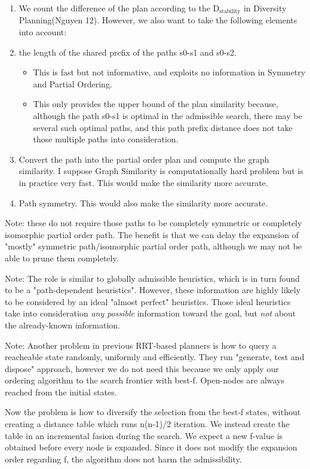 \begin{enumerate}
\item We count the difference of the plan according to the D\(_{\text{stability}}\) in
Diversity Planning(Nguyen 12). However, we also want to take the following elements
into account:
\item the length of the shared prefix of the paths s0-s1 and s0-s2.
\begin{itemize}
\item This is fast but not informative, and exploits no information in
Symmetry and Partial Ordering.
\item This only provides the upper bound of the plan similarity because,
although the path s0-s1 is optimal in the admissible search, there
may be several such optimal paths, and this path prefix distance
does not take those multiple paths into consideration.
\end{itemize}
\item Convert the path into the partial order plan and compute the graph
similarity. I suppose Graph Similarity is computationally hard problem
but is in practice very fast. This would make the similarity
more accurate.
\item Path symmetry. This would also make the similarity more accurate.
\end{enumerate}

Note: these do not require those paths to be completely symmetric or
completely isomorphic partial order path. The benefit is that we can delay
the expansion of "mostly" symmetric path/isomorphic partial order path,
although we may not be able to prune them completely.

Note: The role is similar to globally admissible heuristics, which is in turn
found to be a "path-dependent heuristics". However, these information are
highly likely to be considered by an ideal "almost perfect" heuristics.
Those ideal heuristics take into consideration \emph{any possible} information
toward the goal, but \emph{not} about the already-known information.

Note: Another problem in previous RRT-based planners is how to query a reacheable
state randomly, uniformly and efficiently. They run "generate, test and
dispose" approach, however we do not need this because we only apply our
ordering algorithm to the search frontier with best-f. Open-nodes are
always reached from the initial states.

Now the problem is how to diversify the selection from the best-f states,
without creating a distance table which runs n(n-1)/2 iteration.
We instead create the table in an incremental fasion during the search.
We expect a new f-value is obtained before every node is expanded.
Since it does not modify the expansion order regarding f, the algorithm
does not harm the admissibility.

